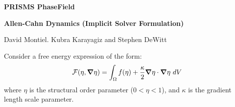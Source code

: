 \documentclass[10pt]{article}
\newcommand{\gv}[1]{\ensuremath{\mbox{\boldmath$ #1 $}}}
\newcommand{\grad}[1]{\gv{\nabla} #1}
\begin{document}
\def\Bomega{\mbox{\boldmath$\omega$}}
\def\Bvarepsilon{\mbox{\boldmath$\varepsilon$}}
\def\Bvartheta{\mbox{\boldmath$\vartheta$}}
\def\Bvarpi{\mbox{\boldmath$\varpi$}}
\def\Bvarrho{\mbox{\boldmath$\varrho$}}
\def\Bvarsigma{\mbox{\boldmath$\varsigma$}}
\def\Bvarphi{\mbox{\boldmath$\varphi$}}
\def\bone{\mathbf{1}}
\def\bzero{\mathbf{0}}
\def\bA{\mbox{\boldmath$ A$}}
\def\bB{\mbox{\boldmath$ B$}}
\def\bC{\mbox{\boldmath$ C$}}
\def\bD{\mbox{\boldmath$ D$}}
\def\bE{\mbox{\boldmath$ E$}}
\def\bF{\mbox{\boldmath$ F$}}
\def\bG{\mbox{\boldmath$ G$}}
\def\bH{\mbox{\boldmath$ H$}}
\def\bI{\mbox{\boldmath$ I$}}
\def\bJ{\mbox{\boldmath$ J$}}
\def\bK{\mbox{\boldmath$ K$}}
\def\bL{\mbox{\boldmath$ L$}}
\def\bM{\mbox{\boldmath$ M$}}
\def\bN{\mbox{\boldmath$ N$}}
\def\bO{\mbox{\boldmath$ O$}}
\def\bP{\mbox{\boldmath$ P$}}
\def\bQ{\mbox{\boldmath$ Q$}}
\def\bR{\mbox{\boldmath$ R$}}
\def\bS{\mbox{\boldmath$ S$}}
\def\bT{\mbox{\boldmath$ T$}}
\def\bU{\mbox{\boldmath$ U$}}
\def\bV{\mbox{\boldmath$ V$}}
\def\bW{\mbox{\boldmath$ W$}}
\def\bX{\mbox{\boldmath$ X$}}
\def\bY{\mbox{\boldmath$ Y$}}
\def\bZ{\mbox{\boldmath$ Z$}}
\def\ba{\mbox{\boldmath$ a$}}
\def\bb{\mbox{\boldmath$ b$}}
\def\bc{\mbox{\boldmath$ c$}}
\def\bd{\mbox{\boldmath$ d$}}
\def\be{\mbox{\boldmath$ e$}}
\def\bff{\mbox{\boldmath$ f$}}
\def\bg{\mbox{\boldmath$ g$}}
\def\bh{\mbox{\boldmath$ h$}}
\def\bi{\mbox{\boldmath$ i$}}
\def\bj{\mbox{\boldmath$ j$}}
\def\bk{\mbox{\boldmath$ k$}}
\def\bl{\mbox{\boldmath$ l$}}
\def\bm{\mbox{\boldmath$ m$}}
\def\bn{\mbox{\boldmath$ n$}}
\def\bo{\mbox{\boldmath$ o$}}
\def\bp{\mbox{\boldmath$ p$}}
\def\bq{\mbox{\boldmath$ q$}}
\def\br{\mbox{\boldmath$ r$}}
\def\bs{\mbox{\boldmath$ s$}}
\def\bt{\mbox{\boldmath$ t$}}
\def\bu{\mbox{\boldmath$ u$}}
\def\bv{\mbox{\boldmath$ v$}}
\def\bw{\mbox{\boldmath$ w$}}
\def\bx{\mbox{\boldmath$ x$}}
\def\by{\mbox{\boldmath$ y$}}
\def\bz{\mbox{\boldmath$ z$}}
\centerline{\Large{\bf PRISMS PhaseField}}
\smallskip
\centerline{\Large{\bf Allen-Cahn Dynamics (Implicit Solver Formulation)}}
\smallskip
\centerline{David Montiel. Kubra Karayagiz and Stephen DeWitt}
\bigskip
\bigskip
\noindent
Consider a free energy expression of the form:
\begin{equation}
 \mathcal{F}(\eta, \grad  \eta) = \int_{\Omega}    f( \eta ) + \frac{\kappa}{2} \grad  \eta  \cdot \grad  \eta    ~dV 
\end{equation}
where $\eta$ is the structural order parameter ($0<\eta<1$), and $\kappa$ is the gradient length scale parameter.
\end{document}
